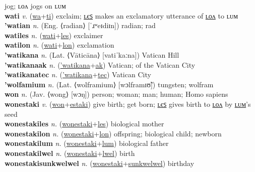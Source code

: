 jog; ʟᴏᴧ jogs on ʟᴜᴍ \label{watafepucocalu} \\
\textbf{wati} \textit{v.} (\hyperref[wa]{wa}+\hyperref[ti]{ti})
exclaim; \hyperref[watiles]{ʟєꜱ} makes an exclamatory utterance of \hyperref[watilon]{ʟᴏᴧ} to ʟᴜᴍ \label{wati} \\
\textbf{'watian} \textit{n.} (Eng. ⟨radian⟩ [ˈɹʷeɪdiɪn])
radian; rad \label{'watian} \\
\textbf{watiles} \textit{n.} (\hyperref[wati]{wati}+\hyperref[les]{les})
exclaimer \label{watiles} \\
\textbf{watilon} \textit{n.} (\hyperref[wati]{wati}+\hyperref[lon]{lon})
exclamation \label{watilon} \\
\textbf{'watikana} \textit{n.} (Lat. ⟨Vāticāna⟩ [vatiˈkaːna])
Vatican Hill \label{'watikana} \\
\textbf{'watikanaak} \textit{n.} (\hyperref['watikana]{'watikana}+\hyperref[ak]{ak})
Vatican; of the Vatican City \label{'watikanaak} \\
\textbf{'watikanatec} \textit{n.} (\hyperref['watikana]{'watikana}+\hyperref[tec]{tec})
Vatican City \label{'watikanatec} \\
\textbf{'wolfamium} \textit{n.} (Lat. ⟨wolframium⟩ [wɔlframɪʊ̃])
tungsten; wolfram \label{'wolfamium} \\
\textbf{won} \textit{n.} (Jav. ⟨wong⟩ [wɔŋ])
person; woman; man; human; Homo sapiens \label{won} \\
\textbf{wonestaki} \textit{v.} (\hyperref[won]{won}+\hyperref[estaki]{estaki})
give birth; get born; \hyperref[wonestakiles]{ʟєꜱ} gives birth to \hyperref[wonestakilon]{ʟᴏᴧ} by \hyperref[wonestakilum]{ʟᴜᴍ}'s seed \label{wonestaki} \\
\textbf{wonestakiles} \textit{n.} (\hyperref[wonestaki]{wonestaki}+\hyperref[les]{les})
biological mother \label{wonestakiles} \\
\textbf{wonestakilon} \textit{n.} (\hyperref[wonestaki]{wonestaki}+\hyperref[lon]{lon})
offspring; biological child; newborn \label{wonestakilon} \\
\textbf{wonestakilum} \textit{n.} (\hyperref[wonestaki]{wonestaki}+\hyperref[lum]{lum})
biological father \label{wonestakilum} \\
\textbf{wonestakilwel} \textit{n.} (\hyperref[wonestaki]{wonestaki}+\hyperref[lwel]{lwel})
birth \label{wonestakilwel} \\
\textbf{wonestakisunkwelwel} \textit{n.} (\hyperref[wonestaki]{wonestaki}+\hyperref[sunkwelwel]{sunkwelwel})
birthday \label{wonestakisunkwelwel} \\
